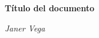 \documentclass{article}
\begin{document}
\begin{titlepage}
    \centering
    \vspace*{1cm}
    \Huge\textbf{Título del documento}

    \vspace{2cm}
    \Large\textit{Janer Vega}

    \vfill
    \small{\date{\today}}
\end{titlepage}
\end{document}
